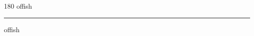 
\begin{frame}
\begin{center}
\begin{turn}{180}
{\fontsize{2.5cm}{1em}\selectfont offish}
\end{turn}
\vspace{1em}\par  
\hrule
\vspace{1em}\par  
{\fontsize{2.5cm}{1em}\selectfont offish}
\end{center}
\end{frame}

